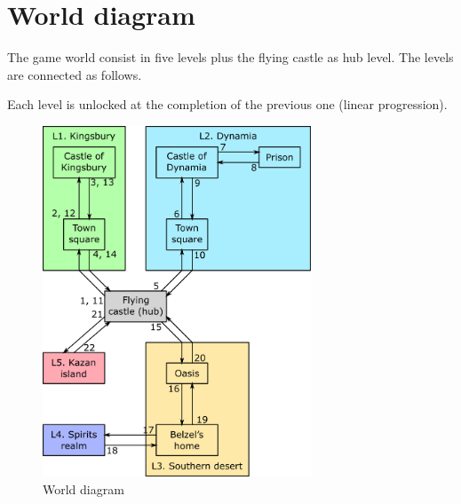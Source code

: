 \section{World diagram}

The game world consist in five levels plus the flying castle as hub level. The levels are connected as follows.

Each level is unlocked at the completion of the previous one (linear progression).

\begin{figure}[H]
  \centering
  \includegraphics[width=8cm]{Images/SVG/Exported/worldDiagram}
  \caption{World diagram}
\end{figure}
